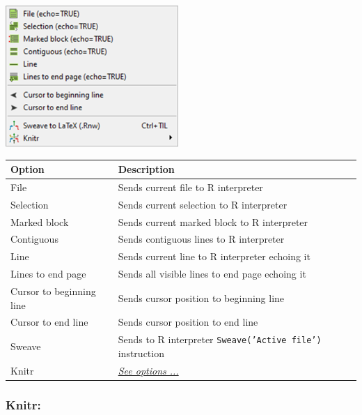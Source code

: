 \includegraphics[scale=0.8]{./res/menu_r_send.png}\\

\begin{scriptsize}
  \begin{tabularx}{\textwidth}{>{\hsize=0.5\hsize}X>{\hsize=0.7\hsize}X}\\
    \hline
    \textbf{Option} & \textbf{Description} \\
    \hline
    File & Sends current file to R interpreter \\
    Selection & Sends current selection to R interpreter \\
    Marked block & Sends current marked block to R interpreter \\
		  Contiguous & Sends contiguous lines to R interpreter \\
    Line & Sends current line to R interpreter echoing it \\
    Lines to end page & Sends all visible lines to end page echoing it \\
    \hdashline[1pt/1pt]
    Cursor to beginning line & Sends cursor position to beginning line \\
    Cursor to end line & Sends cursor position to end line \\
    \hdashline[1pt/1pt]
    Sweave & Sends to R interpreter \texttt{Sweave('Active file')} instruction \\
    Knitr & \textit{\href{\#menu\_r\_send\_knitr}{See options ...}} \\
    \hline
  \end{tabularx}
\end{scriptsize}

\hypertarget{menu_r_send_knitr}{}
\subsubsection{Knitr:}\\

